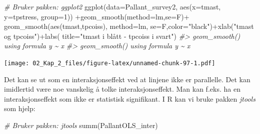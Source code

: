 \documentclass[
]{article}
\newenvironment{Shaded}{\begin{snugshade}}{\end{snugshade}}
\newcommand{\AttributeTok}[1]{\textcolor[rgb]{0.77,0.63,0.00}{#1}}
\newcommand{\CommentTok}[1]{\textcolor[rgb]{0.56,0.35,0.01}{\textit{#1}}}
\newcommand{\DecValTok}[1]{\textcolor[rgb]{0.00,0.00,0.81}{#1}}
\newcommand{\FunctionTok}[1]{\textcolor[rgb]{0.00,0.00,0.00}{#1}}
\newcommand{\NormalTok}[1]{#1}
\newcommand{\SpecialCharTok}[1]{\textcolor[rgb]{0.00,0.00,0.00}{#1}}
\newcommand{\StringTok}[1]{\textcolor[rgb]{0.31,0.60,0.02}{#1}}
\begin{document}
\begin{Shaded}
\begin{Highlighting}[]
\CommentTok{\# Bruker pakken: ggplot2}
\FunctionTok{ggplot}\NormalTok{(}\AttributeTok{data=}\NormalTok{Pallant\_survey2, }\FunctionTok{aes}\NormalTok{(}\AttributeTok{x=}\NormalTok{tmast, }\AttributeTok{y=}\NormalTok{tpstress, }\AttributeTok{group=}\DecValTok{1}\NormalTok{)) }\SpecialCharTok{+}\FunctionTok{geom\_smooth}\NormalTok{(}\AttributeTok{method=}\NormalTok{lm,}\AttributeTok{se=}\NormalTok{F)}\SpecialCharTok{+} 
    \FunctionTok{geom\_smooth}\NormalTok{(}\FunctionTok{aes}\NormalTok{(tmast,tpcoiss), }\AttributeTok{method=}\NormalTok{lm, }\AttributeTok{se=}\NormalTok{F,}\AttributeTok{color=}\StringTok{"black"}\NormalTok{)}\SpecialCharTok{+}\FunctionTok{xlab}\NormalTok{(}\StringTok{"tmast og tpcoiss"}\NormalTok{)}\SpecialCharTok{+}\FunctionTok{labs}\NormalTok{(}
        \AttributeTok{title=}\StringTok{"tmast i blått {-} tpcoiss i svart"}\NormalTok{)}
\CommentTok{\#\textgreater{} \textasciigrave{}geom\_smooth()\textasciigrave{} using formula \textquotesingle{}y \textasciitilde{} x\textquotesingle{}}
\CommentTok{\#\textgreater{} \textasciigrave{}geom\_smooth()\textasciigrave{} using formula \textquotesingle{}y \textasciitilde{} x\textquotesingle{}}
\end{Highlighting}
\end{Shaded}

\texttt{[image: 02\_Kap\_2\_files/figure-latex/unnamed-chunk-97-1.pdf]}

Det kan se ut som en interaksjonseffekt ved at linjene ikke er parallelle. Det kan imidlertid være noe vanskelig å tolke interaksjonseffekt. Man kan f.eks. ha en interaksjonseffekt som ikke er statistisk signifikant. I R kan vi bruke pakken \emph{jtools} som hjelp:

\begin{Shaded}
\begin{Highlighting}[]
\CommentTok{\# Bruker pakken: jtools}
\FunctionTok{summ}\NormalTok{(PallantOLS\_inter)}
\end{Highlighting}
\end{Shaded}
\end{document}
